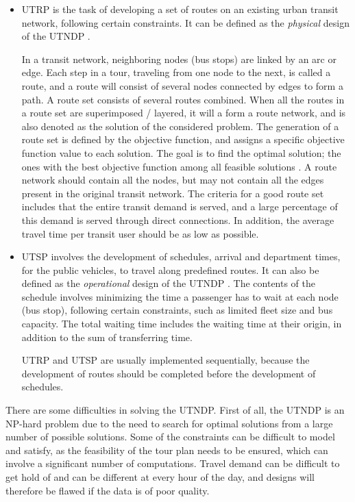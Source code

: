 \begin{itemize}
\item UTRP is the task of developing a set of routes on an existing urban transit network, following certain constraints. It can be defined as the \textit{physical} design of the UTNDP \citep{fan09}. 

In a transit network, neighboring nodes (bus stops) are linked by an arc or edge. Each step in a tour, traveling from one node to the next, is called a route, and a route will consist of several nodes connected by edges to form a path. A route set consists of several routes combined. When all the routes in a route set are superimposed / layered, it will a form a route network, and is also denoted as the solution of the considered problem. The generation of a route set is defined by the objective function, and assigns a specific objective function value to each solution. The goal is to find the optimal solution; the ones with the best objective function among all feasible solutions \citep{vehiclerouting}. A route network should contain all the nodes, but may not contain all the edges present in the original transit network. The criteria for a good route set includes that the entire transit demand is served, and a large percentage of this demand is served through direct connections. In addition, the average travel time per transit user should be as low as possible. 

\item UTSP involves the development of schedules, arrival and department times, for the public vehicles, to travel along predefined routes. It can also be defined as the \textit{operational} design of the UTNDP \citep{fan09}. 
The contents of the schedule involves minimizing the time a passenger has to wait at each node (bus stop), following certain constraints, such as limited fleet size and bus capacity.  The total waiting time includes the waiting time at their origin, in addition to the sum of transferring time.

UTRP and UTSP are usually implemented sequentially, because the development of routes should be completed before the development of schedules. 
\end{itemize}

There are some difficulties in solving the UTNDP. First of all, the UTNDP is an NP-hard problem due to the need to search for optimal solutions from a large number of possible solutions. Some of the constraints can be difficult to model and satisfy, as the feasibility of the tour plan needs to be ensured, which can involve a significant number of computations. Travel demand can be difficult to get hold of and can be different at every hour of the day, and designs will therefore be flawed if the data is of poor quality.  

